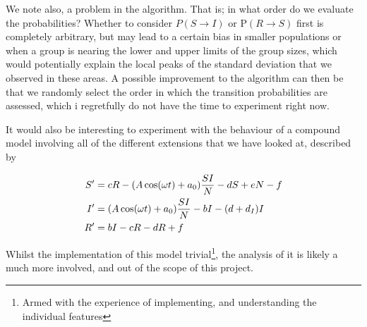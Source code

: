 \documentclass[10pt,showpacs,preprintnumbers,amsmath,amssymb,nofootinbib,aps,prl,twocolumn,groupedaddress,superscriptaddress,showkeys]{revtex4-1}
\begin{document}
  We note also, a problem in the algorithm. That is; in what order do we evaluate the probabilities?
  Whether to consider $P(S\rightarrow I)$ or P$(R\rightarrow S)$ first is completely arbitrary, but may lead to a certain bias in smaller populations or when a group is nearing the lower and upper limits of the group sizes, which would potentially explain the local peaks of the standard deviation that we observed in these areas. A possible improvement to the algorithm can then be that we randomly select the order in which the transition probabilities are assessed, which i regretfully do not have the time to experiment right now.

  It would also be interesting to experiment with the behaviour of a compound model involving all of the different extensions that we have looked at, described by

  \begin{align}
     \begin{split}
        S' &= cR - \qty(A\cos(\omega t) + a_0)\frac{SI}{N} - dS + eN - f \\
        I' &= \qty(A\cos(\omega t)+a_0)\frac{SI}{N} - bI  - (d + d_I)I \\
        R' &= bI - cR - dR + f
     \end{split}
  \end{align} 

   Whilst the implementation of this model trivial\footnote{Armed with the experience of implementing, and understanding the individual features}, the analysis of it is likely a much more involved, and out of the scope of this project.




\end{document}
